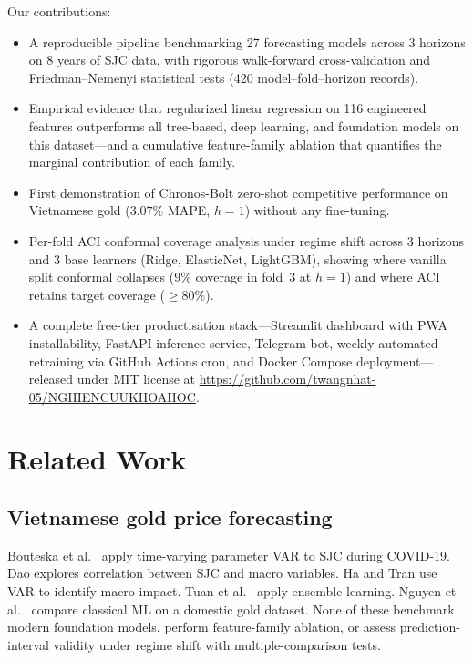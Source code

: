 \documentclass[conference]{IEEEtran}
\begin{document}
Our contributions:
\begin{itemize}
\item A reproducible pipeline benchmarking 27 forecasting models across 3 horizons on 8 years of SJC data, with rigorous walk-forward cross-validation and Friedman--Nemenyi statistical tests (420 model--fold--horizon records).
\item Empirical evidence that regularized linear regression on 116 engineered features outperforms all tree-based, deep learning, and foundation models on this dataset---and a cumulative feature-family ablation that quantifies the marginal contribution of each family.
\item First demonstration of Chronos-Bolt zero-shot competitive performance on Vietnamese gold ($3.07\%$ MAPE, $h=1$) without any fine-tuning.
\item Per-fold ACI conformal coverage analysis under regime shift across 3 horizons and 3 base learners (Ridge, ElasticNet, LightGBM), showing where vanilla split conformal collapses ($9\%$ coverage in fold~3 at $h=1$) and where ACI retains target coverage ($\geq 80\%$).
\item A complete free-tier productisation stack---Streamlit dashboard with PWA installability, FastAPI inference service, Telegram bot, weekly automated retraining via GitHub Actions cron, and Docker Compose deployment---released under MIT license at \url{https://github.com/twangnhat-05/NGHIENCUUKHOAHOC}.
\end{itemize}

\section{Related Work}

\subsection{Vietnamese gold price forecasting}
Bouteska et al.\ \cite{bouteska2023} apply time-varying parameter VAR to SJC during COVID-19. Dao \cite{dao2024} explores correlation between SJC and macro variables. Ha and Tran \cite{ha2023var} use VAR to identify macro impact. Tuan et al.\ \cite{tuan2024ensemble} apply ensemble learning. Nguyen et al.\ \cite{nguyen2025} compare classical ML on a domestic gold dataset. None of these benchmark modern foundation models, perform feature-family ablation, or assess prediction-interval validity under regime shift with multiple-comparison tests.
\end{document}
